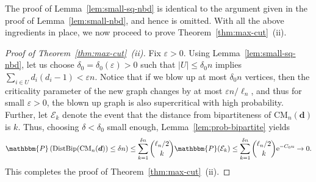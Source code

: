 \documentclass[11pt,a4paper, reqno]{article}
\numberwithin{equation}{section}
\numberwithin{equation}{section}
\newcommand{\prob}[1]{\ensuremath{\mathbbm{P}\left(#1\right)}}
\newcommand{\PR}{\ensuremath{\mathbbm{P}}}
\newcommand{\e}{\ensuremath{\mathrm{e}}}
\newcommand{\1}{\ensuremath{\mathbbm{1}}}
\newcommand{\CM}{\ensuremath{\mathrm{CM}_n(\boldsymbol{d})}}
\numberwithin{equation}{section}
\numberwithin{theorem}{section}
\begin{document}
The proof of Lemma~\ref{lem:small-sq-nbd} is identical to the argument given in the proof of Lemma~\ref{lem:small-nbd}, and hence is omitted. With all the above ingredients in place, we now proceed to prove Theorem~\ref{thm:max-cut}~(ii).
\begin{proof}[Proof of Theorem~\ref{thm:max-cut}~(ii)]
Fix $\varepsilon>0$.
Using Lemma~\ref{lem:small-sq-nbd}, let us choose $\delta_0= \delta_0(\varepsilon)>0$ such that $|U|\leq \delta_0n$ implies $\sum_{i\in U}d_i(d_i-1)<\varepsilon n$.
Notice that if we blow up at most $\delta_0 n$ vertices, then the criticality parameter of the new graph changes by at most $\varepsilon n/\ell_n$, and thus for small $\varepsilon>0$, the blown up graph is also supercritical with high probability. 
Further, let $\mathcal{E}_k$ denote the event that the distance from bipartiteness of $\CM$ is $k$.
Thus, choosing $\delta<\delta_0$ small enough,  Lemma~\ref{lem:prob-bipartite} yields
\begin{equation}
\prob{\mathrm{DistBip}(\CM)\leq \delta n}\leq \sum_{k=1}^{\delta n} {\ell_n/2 \choose k} \PR(\mathcal{E}_k)\leq \sum_{k=1}^{\delta n} {\ell_n/2 \choose k}\e^{-C_0 n} \to 0.
\end{equation} 
This completes the proof of Theorem~\ref{thm:max-cut}~(ii).
\end{proof}
\end{document}
